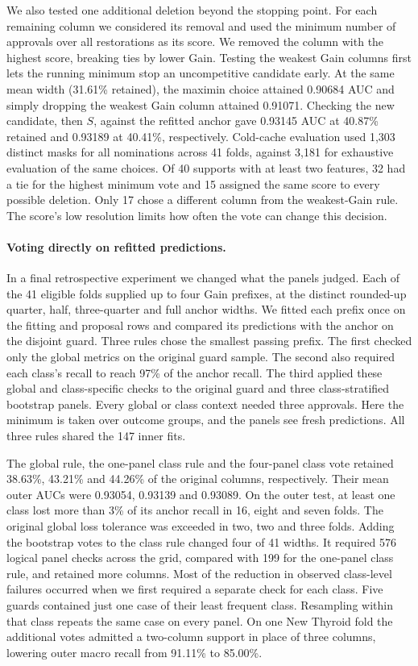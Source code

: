 We also tested one additional deletion beyond the stopping point. For each remaining column we considered its removal and used the minimum number of approvals over all restorations as its score. We removed the column with the highest score, breaking ties by lower Gain. Testing the weakest Gain columns first lets the running minimum stop an uncompetitive candidate early. At the same mean width (31.61\% retained), the maximin choice attained 0.90684 AUC and simply dropping the weakest Gain column attained 0.91071. Checking the new candidate, then $S$, against the refitted anchor gave 0.93145 AUC at 40.87\% retained and 0.93189 at 40.41\%, respectively. Cold-cache evaluation used 1,303 distinct masks for all nominations across 41 folds, against 3,181 for exhaustive evaluation of the same choices. Of 40 supports with at least two features, 32 had a tie for the highest minimum vote and 15 assigned the same score to every possible deletion. Only 17 chose a different column from the weakest-Gain rule. The score's low resolution limits how often the vote can change this decision.

\paragraph{Voting directly on refitted predictions.}
In a final retrospective experiment we changed what the panels judged. Each of the 41 eligible folds supplied up to four Gain prefixes, at the distinct rounded-up quarter, half, three-quarter and full anchor widths. We fitted each prefix once on the fitting and proposal rows and compared its predictions with the anchor on the disjoint guard. Three rules chose the smallest passing prefix. The first checked only the global metrics on the original guard sample. The second also required each class's recall to reach 97\% of the anchor recall. The third applied these global and class-specific checks to the original guard and three class-stratified bootstrap panels. Every global or class context needed three approvals. Here the minimum is taken over outcome groups, and the panels see fresh predictions. All three rules shared the 147 inner fits.

The global rule, the one-panel class rule and the four-panel class vote retained 38.63\%, 43.21\% and 44.26\% of the original columns, respectively. Their mean outer AUCs were 0.93054, 0.93139 and 0.93089. On the outer test, at least one class lost more than 3\% of its anchor recall in 16, eight and seven folds. The original global loss tolerance was exceeded in two, two and three folds. Adding the bootstrap votes to the class rule changed four of 41 widths. It required 576 logical panel checks across the grid, compared with 199 for the one-panel class rule, and retained more columns. Most of the reduction in observed class-level failures occurred when we first required a separate check for each class. Five guards contained just one case of their least frequent class. Resampling within that class repeats the same case on every panel. On one New Thyroid fold the additional votes admitted a two-column support in place of three columns, lowering outer macro recall from 91.11\% to 85.00\%.


